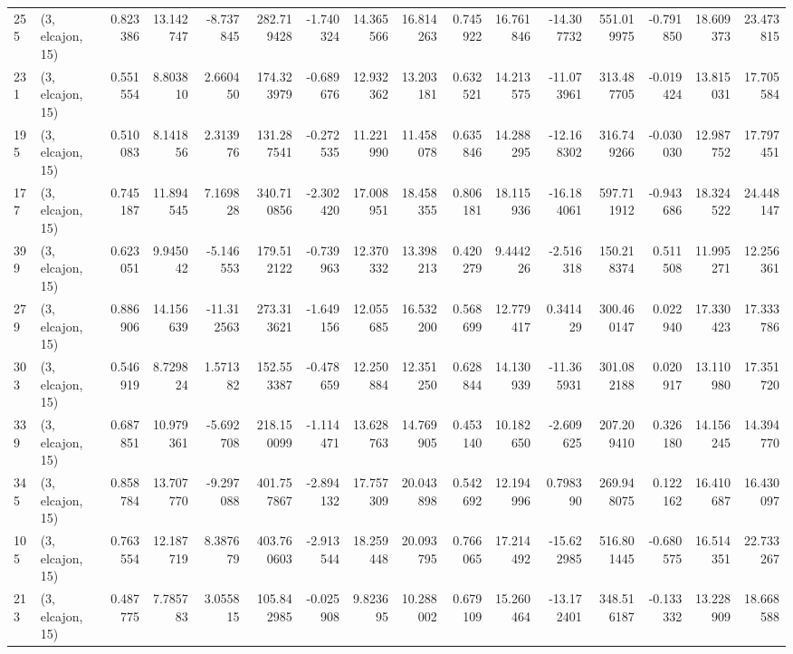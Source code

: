 \begin{tabular}{llrrrrrrrrrrrrrr}
255 &  (3, elcajon, 15) &   0.823386 &  13.142747 &  -8.737845 &   282.719428 &  -1.740324 &  14.365566 &  16.814263 &  0.745922 &  16.761846 & -14.307732 &   551.019975 &  -0.791850 &  18.609373 &  23.473815 \\
231 &  (3, elcajon, 15) &   0.551554 &   8.803810 &   2.660450 &   174.323979 &  -0.689676 &  12.932362 &  13.203181 &  0.632521 &  14.213575 & -11.073961 &   313.487705 &  -0.019424 &  13.815031 &  17.705584 \\
195 &  (3, elcajon, 15) &   0.510083 &   8.141856 &   2.313976 &   131.287541 &  -0.272535 &  11.221990 &  11.458078 &  0.635846 &  14.288295 & -12.168302 &   316.749266 &  -0.030030 &  12.987752 &  17.797451 \\
177 &  (3, elcajon, 15) &   0.745187 &  11.894545 &   7.169828 &   340.710856 &  -2.302420 &  17.008951 &  18.458355 &  0.806181 &  18.115936 & -16.184061 &   597.711912 &  -0.943686 &  18.324522 &  24.448147 \\
399 &  (3, elcajon, 15) &   0.623051 &   9.945042 &  -5.146553 &   179.512122 &  -0.739963 &  12.370332 &  13.398213 &  0.420279 &   9.444226 &  -2.516318 &   150.218374 &   0.511508 &  11.995271 &  12.256361 \\
279 &  (3, elcajon, 15) &   0.886906 &  14.156639 & -11.312563 &   273.313621 &  -1.649156 &  12.055685 &  16.532200 &  0.568699 &  12.779417 &   0.341429 &   300.460147 &   0.022940 &  17.330423 &  17.333786 \\
303 &  (3, elcajon, 15) &   0.546919 &   8.729824 &   1.571382 &   152.553387 &  -0.478659 &  12.250884 &  12.351250 &  0.628844 &  14.130939 & -11.365931 &   301.082188 &   0.020917 &  13.110980 &  17.351720 \\
339 &  (3, elcajon, 15) &   0.687851 &  10.979361 &  -5.692708 &   218.150099 &  -1.114471 &  13.628763 &  14.769905 &  0.453140 &  10.182650 &  -2.609625 &   207.209410 &   0.326180 &  14.156245 &  14.394770 \\
345 &  (3, elcajon, 15) &   0.858784 &  13.707770 &  -9.297088 &   401.757867 &  -2.894132 &  17.757309 &  20.043898 &  0.542692 &  12.194996 &   0.798390 &   269.948075 &   0.122162 &  16.410687 &  16.430097 \\
105 &  (3, elcajon, 15) &   0.763554 &  12.187719 &   8.387679 &   403.760603 &  -2.913544 &  18.259448 &  20.093795 &  0.766065 &  17.214492 & -15.622985 &   516.801445 &  -0.680575 &  16.514351 &  22.733267 \\
213 &  (3, elcajon, 15) &   0.487775 &   7.785783 &   3.055815 &   105.842985 &  -0.025908 &   9.823695 &  10.288002 &  0.679109 &  15.260464 & -13.172401 &   348.516187 &  -0.133332 &  13.228909 &  18.668588 \\

\end{tabular}

